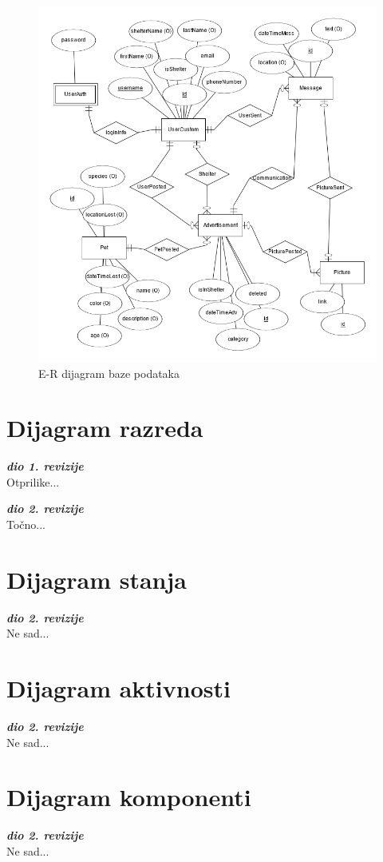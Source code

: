 				\begin{figure}[H]
					\includegraphics[scale=0.65]{dijagrami/dijagramBaze/ERmodel.PNG} %
					\centering
					\caption{E-R dijagram baze podataka}
					\label{fig:erDijagram}
				\end{figure}

			\eject
			
			
		\section{Dijagram razreda}
		
			\textbf{\textit{dio 1. revizije}}\\
			
			Otprilike...
			
			\textbf{\textit{dio 2. revizije}}\\			
			
			Točno...
			
			\eject
		
		\section{Dijagram stanja}
			
			
			\textbf{\textit{dio 2. revizije}}\\
			
			Ne sad...
			
			
			\eject 
		
		\section{Dijagram aktivnosti}
			
			\textbf{\textit{dio 2. revizije}}\\
			
			Ne sad...
			
			\eject
		\section{Dijagram komponenti}
		
			\textbf{\textit{dio 2. revizije}}\\
		
			Ne sad...